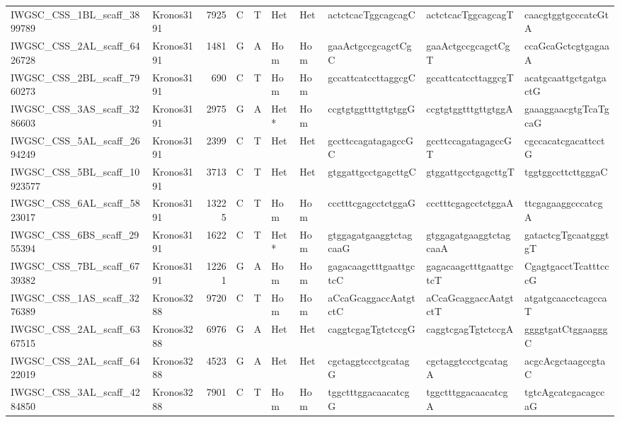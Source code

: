 \begin{tabular}{llrlllllll}
 IWGSC\_CSS\_1BL\_scaff\_3899789  & Kronos3191 &  7925 & C    & T     & Het    & Het   & actctcacTggcagcagC       & actctcacTggcagcagT       & caacgtggtgcccatcGtA      \\
 IWGSC\_CSS\_2AL\_scaff\_6426728  & Kronos3191 &  1481 & G    & A     & Hom    & Hom   & gaaActgccgcagctCgC       & gaaActgccgcagctCgT       & ccaGcaGctcgtgagaaA       \\
 IWGSC\_CSS\_2BL\_scaff\_7960273  & Kronos3191 &   690 & C    & T     & Hom    & Hom   & gccattcatccttaggcgC      & gccattcatccttaggcgT      & acatgcaattgctgatgactG    \\
 IWGSC\_CSS\_3AS\_scaff\_3286603  & Kronos3191 &  2975 & G    & A     & Het*   & Hom   & ccgtgtggtttgttgtggG      & ccgtgtggtttgttgtggA      & gaaaggaacgtgTcaTgcaG     \\
 IWGSC\_CSS\_5AL\_scaff\_2694249  & Kronos3191 &  2399 & C    & T     & Het    & Het   & gccttccagatagagccGC      & gccttccagatagagccGT      & cgccacatcgacattcctG      \\
 IWGSC\_CSS\_5BL\_scaff\_10923577 & Kronos3191 &  3713 & C    & T     & Het    & Het   & gtggattgcctgagcttgC      & gtggattgcctgagcttgT      & tggtggccttcttgggaC       \\
 IWGSC\_CSS\_6AL\_scaff\_5823017  & Kronos3191 & 13225 & C    & T     & Hom    & Hom   & ccctttcgagcctctggaG      & ccctttcgagcctctggaA      & ttcgagaaggcccatcgA       \\
 IWGSC\_CSS\_6BS\_scaff\_2955394  & Kronos3191 &  1622 & C    & T     & Het*   & Hom   & gtggagatgaaggtctagcaaG   & gtggagatgaaggtctagcaaA   & gatactcgTgcaatgggtgT     \\
 IWGSC\_CSS\_7BL\_scaff\_6739382  & Kronos3191 & 12261 & G    & A     & Hom    & Hom   & gagacaagctttgaattgctcC   & gagacaagctttgaattgctcT   & CgagtgacctTcatttcccG     \\
 IWGSC\_CSS\_1AS\_scaff\_3276389  & Kronos3288 &  9720 & C    & T     & Hom    & Hom   & aCcaGcaggaccAatgtctC     & aCcaGcaggaccAatgtctT     & atgatgcaacctcagccaT      \\
 IWGSC\_CSS\_2AL\_scaff\_6367515  & Kronos3288 &  6976 & G    & A     & Het    & Het   & caggtcgagTgtctccgG       & caggtcgagTgtctccgA       & ggggtgatCtggaagggC       \\
 IWGSC\_CSS\_2AL\_scaff\_6422019  & Kronos3288 &  4523 & G    & A     & Het    & Het   & cgctaggtccctgcatagG      & cgctaggtccctgcatagA      & acgcAcgctaagccgtaC       \\
 IWGSC\_CSS\_3AL\_scaff\_4284850  & Kronos3288 &  7901 & C    & T     & Hom    & Hom   & tggctttggacaacatcgG      & tggctttggacaacatcgA      & tgtcAgcatcgacagccaG      \\

\end{tabular}

